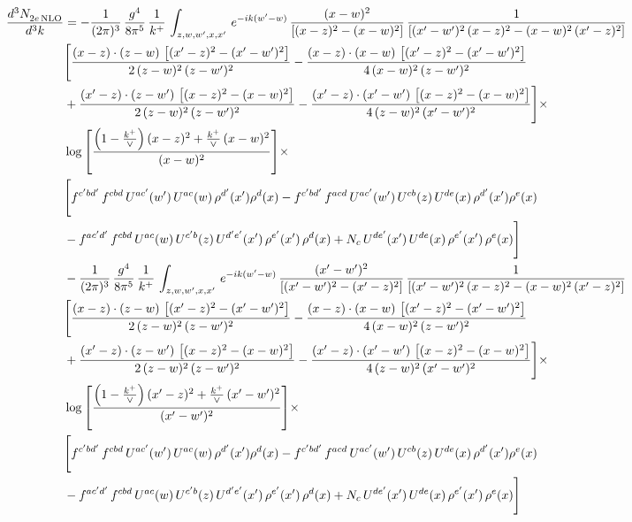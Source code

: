 \documentclass[9pt]{article}
\numberwithin{equation}{section}
\begin{document}
\begin{align}
 \frac{d^{3}N_{2e\,\rm NLO}^{\rm}}{d^{3}k}  & =   -\frac{1}{(2\pi)^{3}}\, \frac{g^{4}}{8\pi^{5}}\,\frac{1}{k^{+}}\,\int_{z,w,w^{\prime},x,x'}\, e^{-ik(w^{\prime}-w)}\,\frac{(x-w)^{2}}{\left[(x-z)^{2}-(x-w)^{2}\right]}\, \frac{1}{\left[(x'-w')^{2}\, (x-z)^{2} - (x-w)^{2}\, (x'-z)^{2}\right]} \notag \\ & \Bigg[\frac{(x-z)\cdot (z-w)\, \left[(x'-z)^{2}-(x'-w')^{2}\right]}{2\, (z-w)^{2}\, (z-w')^{2}}  - \frac{(x-z)\cdot (x-w)\,\left[(x'-z)^{2}-(x'-w')^{2}\right] }{4\,(x-w)^{2}\,(z-w')^{2}}\notag \\ & +\frac{(x'-z)\cdot (z-w')\, \left[(x-z)^{2}-(x-w)^{2}\right]}{2\, (z-w)^{2}\, (z-w')^{2}}-\frac{(x'-z)\cdot (x'-w')\, \left[(x-z)^{2}-(x-w)^{2}\right]}{4\, (z-w)^{2}\,(x'-w')^{2}}\Bigg]\times\,\notag \\ & \log{\left[\frac{\left(1-\frac{k^{+}}{\vee}\right)(x-z)^{2}+\frac{k^{+}}{\vee}\,(x-w)^{2}}{(x-w)^{2}}\right]}\times\,\notag \\ & \Bigg[f^{c'bd'}\,f^{cbd}\, U^{ac'}(w')\,U^{ac}(w)\,\rho^{d'}(x')\rho^{d}(x)- f^{c'bd'}\,f^{acd}\,U^{ac'}(w')\,U^{cb}(z)\,U^{de}(x)\,\rho^{d'}(x')\rho^{e}(x) \notag \\ & -f^{ac'd'}\,f^{cbd}\,U^{ac}(w)\,U^{c'b}(z)\,U^{d'e'}(x')\,\rho^{e'}(x')\,\rho^{d}(x) +N_{c}\,U^{de'}(x')\,U^{de}(x)\,\rho^{e'}(x')\,\rho^{e}(x)\Bigg] \notag \\
& -\frac{1}{(2\pi)^{3}}\, \frac{g^{4}}{8\pi^{5}}\,\frac{1}{k^{+}}\,\int_{z,w,w^{\prime},x,x'}\, e^{-ik(w^{\prime}-w)}\, \frac{(x'-w')^{2}}{\left[(x'-w')^{2}-(x'-z)^{2}\right]}\, \frac{1}{\left[(x'-w')^{2}\, (x-z)^{2} - (x-w)^{2}\, (x'-z)^{2}\right]}  \notag \\ & \Bigg[\frac{(x-z)\cdot (z-w)\, \left[(x'-z)^{2}-(x'-w')^{2}\right]}{2\, (z-w)^{2}\, (z-w')^{2}}  - \frac{(x-z)\cdot (x-w)\,\left[(x'-z)^{2}-(x'-w')^{2}\right] }{4\,(x-w)^{2}\,(z-w')^{2}}\notag \\ & +\frac{(x'-z)\cdot (z-w')\, \left[(x-z)^{2}-(x-w)^{2}\right]}{2\, (z-w)^{2}\, (z-w')^{2}}-\frac{(x'-z)\cdot (x'-w')\, \left[(x-z)^{2}-(x-w)^{2}\right]}{4\, (z-w)^{2}\,(x'-w')^{2}}\Bigg]\times\,\notag \\ & \log{\left[\frac{\left(1-\frac{k^{+}}{\vee}\right)(x'-z)^{2}+\frac{k^{+}}{\vee}\,(x'-w')^{2}}{(x'-w')^{2}}\right]}\times\notag \\ & \Bigg[f^{c'bd'}\,f^{cbd}\, U^{ac'}(w')\,U^{ac}(w)\,\rho^{d'}(x')\rho^{d}(x)- f^{c'bd'}\,f^{acd}\,U^{ac'}(w')\,U^{cb}(z)\,U^{de}(x)\,\rho^{d'}(x')\rho^{e}(x) \notag \\ & -f^{ac'd'}\,f^{cbd}\,U^{ac}(w)\,U^{c'b}(z)\,U^{d'e'}(x')\,\rho^{e'}(x')\,\rho^{d}(x) +N_{c}\,U^{de'}(x')\,U^{de}(x)\,\rho^{e'}(x')\,\rho^{e}(x)\Bigg]
\end{align}
\end{document}
